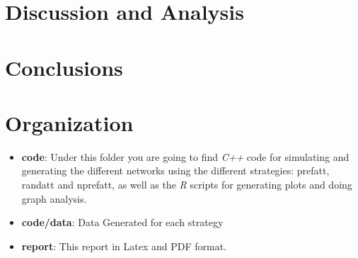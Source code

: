 \documentclass[12pt, a4paper]{article}
\begin{document}
\section{Discussion and Analysis}
\section{Conclusions}




\appendix
\section{Organization}

\begin{itemize}
    \item \textbf{code}: Under this folder you are going to find \textit{C++} code for simulating and generating the different networks using the different strategies: \acrfull{prefatt}, \acrfull{randatt} and \acrfull{nprefatt}, as well as the \textit{R} scripts for generating plots and doing graph analysis.
    \item \textbf{code/data}: Data Generated for each strategy
    \item \textbf{report}: This report in Latex and PDF format.
\end{itemize}
\end{document}

